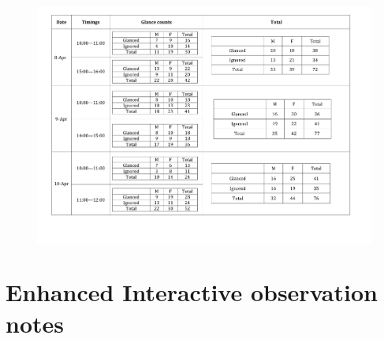 \begin{appendices}
\begin{figure}[H]
 \centering 
    \includegraphics[width=\textwidth,height=0.5\textheight]{Appendices/9/new_body_glance.pdf}
     \label{app:EnhancedInteractiveadvertisementGlance}%
\end{figure}


\section{Enhanced Interactive observation notes}


\end{appendices}
